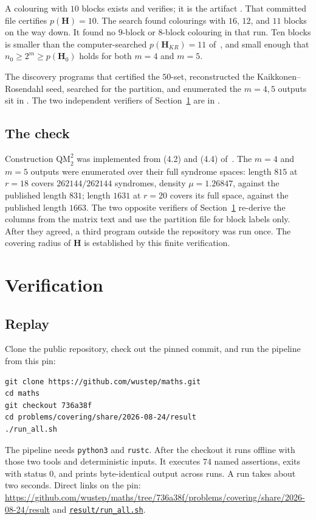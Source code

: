 \documentclass[11pt,a4paper]{article}
\newcommand{\HH}{\boldsymbol{H}}
\begin{document}
A colouring with $10$ blocks exists and verifies; it is the artifact
. That committed file certifies
$p(\HH)=10$. The search found colourings with $16$, $12$, and $11$
blocks on the way down. It found no $9$-block or $8$-block colouring
in that run. Ten blocks is smaller than the computer-searched
$p(\HH_{KR})=11$ of~\cite{DMP2025}, and small enough that
$n_0\ge 2^m\ge p(\HH_0)$ holds for both $m=4$ and $m=5$.

The discovery programs that certified the $50$-set, reconstructed the
Kaikkonen--Rosendahl seed, searched for the partition, and enumerated
the $m=4,5$ outputs sit in
.
The two independent verifiers of Section~\ref{sec:verif} are in
.

\subsection{The check}

Construction $\mathrm{QM}_2^2$ was implemented from (4.2) and (4.4)
of~\cite{DMP2025}. The $m=4$ and $m=5$ outputs were enumerated over
their full syndrome spaces: length $815$ at $r=18$ covers
$262144/262144$ syndromes, density $\mu=1.26847$, against the
published length $831$; length $1631$ at $r=20$ covers its full space,
against the published length $1663$. The two opposite verifiers of
Section~\ref{sec:verif} re-derive the columns from the matrix text and
use the partition file for block labels only. After they agreed, a
third program outside the repository was run once. The covering
radius of $\HH$ is established by this finite verification.

\section{Verification}
\label{sec:verif}

\subsection{Replay}

Clone the public repository, check out the pinned commit, and run
the pipeline from this pin:
\begin{verbatim}
git clone https://github.com/wustep/maths.git
cd maths
git checkout 736a38f
cd problems/covering/share/2026-08-24/result
./run_all.sh
\end{verbatim}
The pipeline needs \texttt{python3} and \texttt{rustc}. After
the checkout it runs offline with those two tools and deterministic
inputs. It executes $74$ named assertions, exits with status $0$, and
prints byte-identical output across runs. A run takes about two
seconds.
Direct links on the pin:
\url{https://github.com/wustep/maths/tree/736a38f/problems/covering/share/2026-08-24/result}
and
\href{https://github.com/wustep/maths/blob/736a38f/problems/covering/share/2026-08-24/result/run_all.sh}{\texttt{result/run\_all.sh}}.
\end{document}
